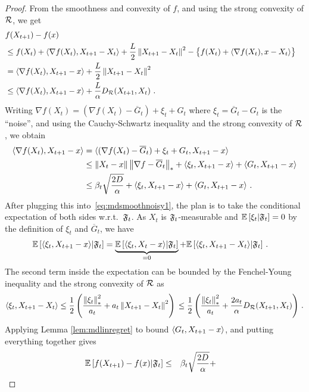 \begin{proof}
From the smoothness and convexity of $f$, and using the strong convexity of $\mathcal{R}$, we get
\begin{align}
\lefteqn{f(X_{t+1}) - f(x)  } \nonumber \\
& \le  f(X_t) + \ip{\nabla f(X_t), X_{t+1}-X_t} + \frac{L}{2} \norm{X_{t+1}-X_t}^2 - \big\{f(X_t) + \ip{\nabla f(X_t) , x- X_t} \big\}  \nonumber \\
& = \ip{\nabla f(X_t), X_{t+1}-x} + \frac{L}{2}\norm{ X_{t+1} - X_t}^2 \nonumber \\
& \le \ip{\nabla f(X_t), X_{t+1}-x} + \frac{L}{\alpha} D_{\cR}(X_{t+1},X_t)~. \label{eq:mdsmoothnoisy1}
\end{align}
Writing
$\nabla f (X_t) = (\nabla f(X_t)-\overline G_t)  + \xi_t + G_t$ where $\xi_t = \overline G_t - G_t$ is the ``noise'', and using the Cauchy-Schwartz inequality
and the strong convexity of $\mathcal{R}$,
we obtain
\begin{align*}
\langle \nabla f(X_{t}),X_{t+1}-x \rangle
 &= \langle (\nabla f(X_t)-\overline G_t)  + \xi_t + G_t,X_{t+1}-x \rangle  \nonumber \\
 & \le \left\|X_t-x\right\|\left\|\nabla f-\overline G_t\right\|_* + \langle \xi_t,X_{t+1}-x \rangle + \langle  G_t, X_{t+1} - x  \rangle \nonumber \\
&\le \beta_t \sqrt{ \frac{2D}{\alpha} } + \langle \xi_t,X_{t+1}-x \rangle + \langle  G_t, X_{t+1} - x  \rangle~.
\end{align*}
After plugging this into~\eqref{eq:mdsmoothnoisy1},
the plan is to take the conditional expectation of both sides w.r.t.\  $\mathfrak{F}_{t}$.
As $X_t$ is $\mathfrak{F}_{t}$-measurable and $\mathbb{E}\left[ \xi_t|\mathfrak{F}_{t}\right] = 0$ by the definition of $\xi_t$ and $\overline G_t$,
we have
\begin{align*}
\MoveEqLeft
\EE{\ip{\xi_t, X_{t+1}-x}|\cS_{t}} = \underbrace{\EE{\ip{\xi_t,X_{t}-x}|\cS_{t}}}_{=0} + \EE{\ip{\xi_t,X_{t+1}-X_t}|\cS_{t}} \,.
\end{align*}
The second term inside the expectation can be bounded by the Fenchel-Young inequality and the strong convexity of $\mathcal{R}$ as
\[
\langle \xi_t,X_{t+1}-X_t \rangle \le \frac12 \left(\frac{\left\|\xi_t\right\|_*^2}{a_t} + a_t \left\|X_{t+1}-X_t\right\|^2\right)\,
\le \frac12 \left(\frac{\left\|\xi_t\right\|_*^2}{a_t} + \frac{2a_t}{\alpha} D_{\mathcal{R}}(X_{t+1},X_t) \right)\,.
\]
Applying
Lemma \ref{lem:mdlinregret}
to bound $\langle  G_t, X_{t+1} - x  \rangle$, and putting everything together gives
\begin{align*}
 \EE{f(X_{t+1}) - f(x) |\cS_{t} }
\le & \quad
 \beta_t \sqrt{ \frac{2D}{\alpha} }+

\end{align*}
\end{proof}
